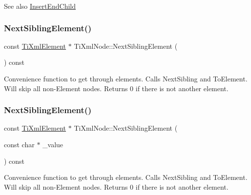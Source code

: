 \begin{DoxySeeAlso}{See also}
\hyperlink{class_ti_xml_node_af287a913ce46d8dbf7ef24fec69bbaf0}{Insert\+End\+Child} 
\end{DoxySeeAlso}
\hypertarget{class_ti_xml_node_ac6105781c913a42aa7f3f17bd1964f7c}{}\label{class_ti_xml_node_ac6105781c913a42aa7f3f17bd1964f7c} 
\subsubsection{\texorpdfstring{Next\+Sibling\+Element()}{NextSiblingElement()}\hspace{0.1cm}{\footnotesize\ttfamily [1/2]}}
{\footnotesize\ttfamily const \hyperlink{class_ti_xml_element}{Ti\+Xml\+Element} $\ast$ Ti\+Xml\+Node\+::\+Next\+Sibling\+Element (\begin{DoxyParamCaption}{ }\end{DoxyParamCaption}) const}

Convenience function to get through elements. Calls Next\+Sibling and To\+Element. Will skip all non-\/\+Element nodes. Returns 0 if there is not another element. \hypertarget{class_ti_xml_node_a22def4746238abaee042f99b47ef3c94}{}\label{class_ti_xml_node_a22def4746238abaee042f99b47ef3c94} 
\subsubsection{\texorpdfstring{Next\+Sibling\+Element()}{NextSiblingElement()}\hspace{0.1cm}{\footnotesize\ttfamily [2/2]}}
{\footnotesize\ttfamily const \hyperlink{class_ti_xml_element}{Ti\+Xml\+Element} $\ast$ Ti\+Xml\+Node\+::\+Next\+Sibling\+Element (\begin{DoxyParamCaption}\item[{const char $\ast$}]{\+\_\+value }\end{DoxyParamCaption}) const}

Convenience function to get through elements. Calls Next\+Sibling and To\+Element. Will skip all non-\/\+Element nodes. Returns 0 if there is not another element. \hypertarget{class_ti_xml_node_a543208c2c801c84a213529541e904b9f}{}\label{class_ti_xml_node_a543208c2c801c84a213529541e904b9f} 
